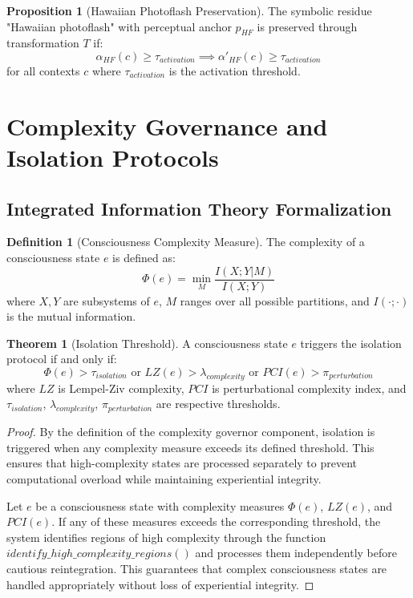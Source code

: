 \documentclass[11pt]{article}
\theoremstyle{definition}
\newtheorem{definition}{Definition}
\newtheorem{theorem}{Theorem}
\newtheorem{proposition}{Proposition}
\begin{document}
\begin{proposition}[Hawaiian Photoflash Preservation]
The symbolic residue "Hawaiian photoflash" with perceptual anchor $p_{HF}$ is preserved through transformation $T$ if:
\begin{equation}
\alpha_{HF}(c) \geq \tau_{activation} \implies \alpha'_{HF}(c) \geq \tau_{activation}
\end{equation}
for all contexts $c$ where $\tau_{activation}$ is the activation threshold.
\end{proposition}

\section{Complexity Governance and Isolation Protocols}

\subsection{Integrated Information Theory Formalization}

\begin{definition}[Consciousness Complexity Measure]
The complexity of a consciousness state $e$ is defined as:
\begin{equation}
\Phi(e) = \min_{M} \frac{I(X;Y|M)}{I(X;Y)}
\end{equation}
where $X, Y$ are subsystems of $e$, $M$ ranges over all possible partitions, and $I(\cdot;\cdot)$ is the mutual information.
\end{definition}

\begin{theorem}[Isolation Threshold]
A consciousness state $e$ triggers the isolation protocol if and only if:
\begin{equation}
\Phi(e) > \tau_{isolation} \text{ or } LZ(e) > \lambda_{complexity} \text{ or } PCI(e) > \pi_{perturbation}
\end{equation}
where $LZ$ is Lempel-Ziv complexity, $PCI$ is perturbational complexity index, and $\tau_{isolation}$, $\lambda_{complexity}$, $\pi_{perturbation}$ are respective thresholds.
\end{theorem}

\begin{proof}
By the definition of the complexity governor component, isolation is triggered when any complexity measure exceeds its defined threshold. This ensures that high-complexity states are processed separately to prevent computational overload while maintaining experiential integrity.

Let $e$ be a consciousness state with complexity measures $\Phi(e)$, $LZ(e)$, and $PCI(e)$. If any of these measures exceeds the corresponding threshold, the system identifies regions of high complexity through the function $identify\_high\_complexity\_regions()$ and processes them independently before cautious reintegration. This guarantees that complex consciousness states are handled appropriately without loss of experiential integrity.
\end{proof}
\end{document}
